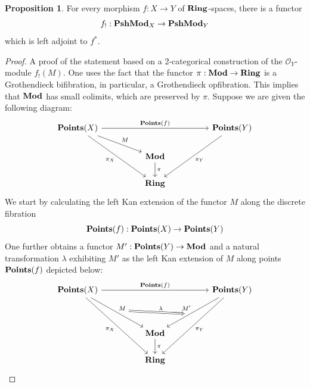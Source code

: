 \documentclass[8pt]{article}
\theoremstyle{definition}
\theoremstyle{definition}
\theoremstyle{definition}
\theoremstyle{definition}
\theoremstyle{definition}
\theoremstyle{definition}
\theoremstyle{definition}
\newtheorem{prop}{Proposition}[section]
\theoremstyle{definition}
\theoremstyle{definition}
\theoremstyle{definition}
\theoremstyle{definition}
\theoremstyle{definition}
\theoremstyle{definition}
\theoremstyle{definition}
\theoremstyle{question}
\begin{document}
\begin{prop}
  For every morphism $f : X \to Y$ of ${\bf Ring}$-spaces, there is a functor
  \[
  f_! : {\bf PshMod}_X \to {\bf PshMod}_Y
  \]
  which is left adjoint to $f^*$.
\end{prop}

\begin{proof}

A proof of the statement based on a 2-categorical construction of the $\mathcal{O}_Y$-module $f_!(M)$.
One uses the fact that the functor $\pi : {\bf Mod} \to {\bf Ring}$ is a Grothendieck bifibration, in particular,
a Grothendieck opfibration. This implies that ${\bf Mod}$ has small colimits, which are preserved by $\pi$.
Suppose we are given the following diagram:
\[
\begin{tikzcd}
  {\bf Points}(X) \ar[rrrr, "{\bf Points}(f)"] \ar[drr, "M"] \ar[ddrr, "\pi_X"'] &&&& {\bf Points}(Y) \ar[ddll, "\pi_Y"] \\
  && {\bf Mod} \ar[d, "\pi"] \\
  && {\bf Ring}
\end{tikzcd}
\]
We start by calculating the left Kan extension of the functor $M$ along the discrete fibration
\[
{\bf Points}(f) : {\bf Points}(X) \to {\bf Points}(Y)
\]
One further obtains a functor $M' : {\bf Points}(Y) \to {\bf Mod}$ and a natural transformation $\lambda$
exhibiting $M'$ as the left Kan extension of $M$ along points ${\bf Points}(f)$ depicted below:
\[
\begin{tikzcd}
  {\bf Points}(X) \ar[rrrr, "{\bf Points}(f)"] \ar[ddrr, "M", ""{name=M}] \ar[dddrr, "\pi_X"'] &&&& {\bf Points}(Y) \ar[dddll, "\pi_Y"] \ar[ddll, "M'"', ""{name=M'}] \\
  \\
  && {\bf Mod} \ar[d, "\pi"] \\
  && {\bf Ring}
  \ar[from=M,to=M', Rightarrow, "\lambda", shorten=3.5mm]
\end{tikzcd}
\]


\end{proof}
\end{document}
